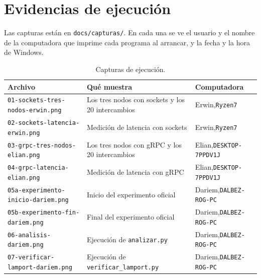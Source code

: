 \documentclass[11pt,a4paper]{article}
\begin{document}
\section{Evidencias de ejecución}

Las capturas están en \texttt{docs/capturas/}. En cada una se ve el usuario y el nombre de la computadora que imprime cada programa al arrancar, y la fecha y la hora de Windows.

\begin{table}[H]
\centering
\caption{Capturas de ejecución.}
\label{tab:capturas}
\small
\begin{tabularx}{\textwidth}{>{\raggedright\arraybackslash}p{6.2cm} >{\raggedright\arraybackslash}X >{\raggedright\arraybackslash}p{3.0cm}}
\toprule
Archivo & Qué muestra & Computadora \\
\midrule
\texttt{01-sockets-tres-nodos-erwin.png} & Los tres nodos con sockets y los 20 intercambios & Erwin,\newline \texttt{Ryzen7} \\
\texttt{02-sockets-latencia-erwin.png} & Medición de latencia con sockets & Erwin,\newline \texttt{Ryzen7} \\
\texttt{03-grpc-tres-nodos-elian.png} & Los tres nodos con gRPC y los 20 intercambios & Elian,\newline \texttt{DESKTOP-7PPDV1J} \\
\texttt{04-grpc-latencia-elian.png} & Medición de latencia con gRPC & Elian,\newline \texttt{DESKTOP-7PPDV1J} \\
\texttt{05a-experimento-inicio-dariem.png} & Inicio del experimento oficial & Dariem,\newline \texttt{DALBEZ-ROG-PC} \\
\texttt{05b-experimento-fin-dariem.png} & Final del experimento oficial & Dariem,\newline \texttt{DALBEZ-ROG-PC} \\
\texttt{06-analisis-dariem.png} & Ejecución de \texttt{analizar.py} & Dariem,\newline \texttt{DALBEZ-ROG-PC} \\
\texttt{07-verificar-lamport-dariem.png} & Ejecución de \texttt{verificar\_lamport.py} & Dariem,\newline \texttt{DALBEZ-ROG-PC} \\
\bottomrule
\end{tabularx}
\end{table}
\end{document}
